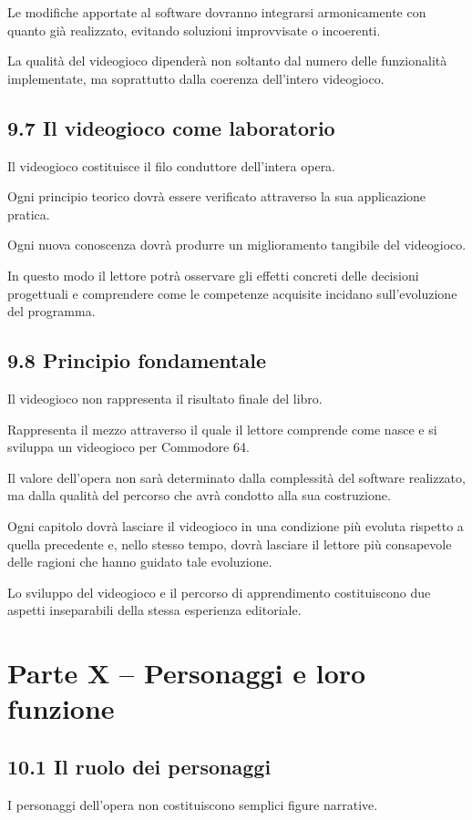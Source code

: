 \documentclass{article}
\begin{document}
Le modifiche apportate al software dovranno integrarsi armonicamente con quanto già realizzato, evitando soluzioni
improvvisate o incoerenti.

La qualità del videogioco dipenderà non soltanto dal numero delle funzionalità implementate, ma soprattutto dalla
coerenza dell'intero videogioco.

\subsection{9.7 Il videogioco come laboratorio}
Il videogioco costituisce il filo conduttore dell'intera opera.

Ogni principio teorico dovrà essere verificato attraverso la sua applicazione pratica.

Ogni nuova conoscenza dovrà produrre un miglioramento tangibile del videogioco.

In questo modo il lettore potrà osservare gli effetti concreti delle decisioni progettuali e comprendere come le
competenze acquisite incidano sull'evoluzione del programma.

\subsection{9.8 Principio fondamentale}
Il videogioco non rappresenta il risultato finale del libro.

Rappresenta il mezzo attraverso il quale il lettore comprende come nasce e si sviluppa un videogioco per Commodore 64.

Il valore dell'opera non sarà determinato dalla complessità del software realizzato, ma dalla qualità del percorso che
avrà condotto alla sua costruzione.

Ogni capitolo dovrà lasciare il videogioco in una condizione più evoluta rispetto a quella precedente e, nello stesso
tempo, dovrà lasciare il lettore più consapevole delle ragioni che hanno guidato tale evoluzione.

Lo sviluppo del videogioco e il percorso di apprendimento costituiscono due aspetti inseparabili della stessa esperienza
editoriale.

\section{Parte X – Personaggi e loro funzione}
\subsection{10.1 Il ruolo dei personaggi}
I personaggi dell'opera non costituiscono semplici figure narrative.
\end{document}
